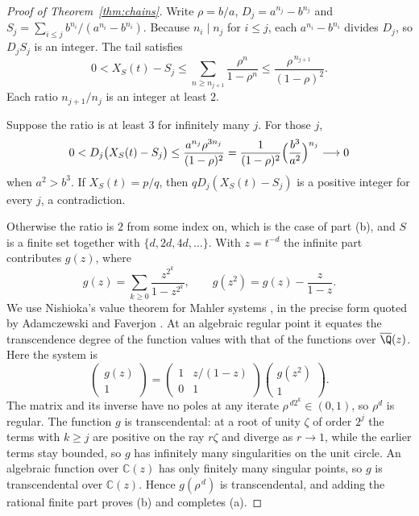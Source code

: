 \documentclass[11pt]{article}
\begin{document}
\begin{proof}[Proof of Theorem~\ref{thm:chains}]
Write $\rho=b/a$, $D_j=a^{n_j}-b^{n_j}$ and
$S_j=\sum_{i\le j}b^{n_i}/(a^{n_i}-b^{n_i})$.  Because $n_i\mid n_j$ for
$i\le j$, each $a^{n_i}-b^{n_i}$ divides $D_j$, so $D_jS_j$ is an integer.  The
tail satisfies
\[
 0<X_S(t)-S_j\le\sum_{n\ge n_{j+1}}\frac{\rho^n}{1-\rho^n}
 \le\frac{\rho^{\,n_{j+1}}}{(1-\rho)^2}.
\]
Each ratio $n_{j+1}/n_j$ is an integer at least $2$.

Suppose the ratio is at least $3$ for infinitely many $j$.  For those $j$,
\[
 0<D_j\bigl(X_S(t)-S_j\bigr)\le\frac{a^{n_j}\rho^{3n_j}}{(1-\rho)^2}
 =\frac{1}{(1-\rho)^2}\Bigl(\frac{b^3}{a^2}\Bigr)^{n_j}\longrightarrow0
\]
when $a^2>b^3$.  If $X_S(t)=p/q$, then $qD_j(X_S(t)-S_j)$ is a positive
integer for every $j$, a contradiction.

Otherwise the ratio is $2$ from some index on, which is the case of part (b),
and $S$ is a finite set together with $\{d,2d,4d,\dots\}$.  With $z=t^{-d}$ the
infinite part contributes $g(z)$, where
\[
 g(z)=\sum_{k\ge0}\frac{z^{2^k}}{1-z^{2^k}},\qquad
 g(z^2)=g(z)-\frac{z}{1-z}.
\]
We use Nishioka's value theorem for Mahler systems
\cite{nishioka1996}, in the precise form quoted by Adamczewski and Faverjon
\cite[Theorem~1.1, p.~3]{adamczewskifaverjon2016}.  At an algebraic regular
point it equates the transcendence degree of the function values with that
of the functions over $\overline{\Q}(z)$.  Here the system is
\[
 \begin{pmatrix}g(z)\\1\end{pmatrix}
 =\begin{pmatrix}1&z/(1-z)\\0&1\end{pmatrix}
  \begin{pmatrix}g(z^2)\\1\end{pmatrix}.
\]
The matrix and its inverse have no poles at any iterate
$\rho^{\,d2^k}\in(0,1)$, so $\rho^d$ is regular.
The function $g$ is transcendental: at a root of unity
$\zeta$ of order $2^j$ the terms with $k\ge j$ are positive on the ray
$r\zeta$ and diverge as $r\to1$, while the earlier terms stay bounded, so $g$
has infinitely many singularities on the unit circle.  An algebraic function
over $\mathbb{C}(z)$ has only finitely many singular points, so $g$ is
transcendental over $\mathbb{C}(z)$.  Hence $g(\rho^{\,d})$ is
transcendental, and adding the rational finite part proves (b) and completes
(a).
\end{proof}
\end{document}
